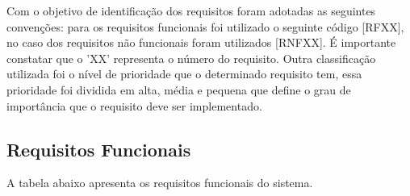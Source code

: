 Com o objetivo de identificação dos requisitos foram adotadas as seguintes convenções:  para os requisitos funcionais foi utilizado o seguinte código [RFXX], no caso dos requisitos não funcionais foram utilizados [RNFXX]. É importante constatar que o 'XX' representa o número do requisito.  Outra classificação utilizada foi o nível de prioridade que o determinado requisito tem, essa prioridade foi dividida em alta, média e pequena que define o grau de importância que o requisito deve ser implementado.

\subsection{Requisitos Funcionais}

A tabela abaixo apresenta os requisitos funcionais do sistema.


